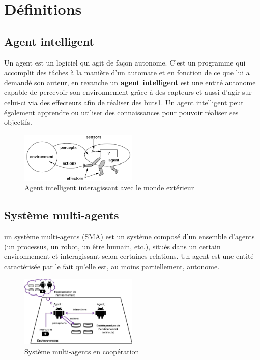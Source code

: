 \section{Définitions}
\subsection{Agent intelligent}
Un agent est un logiciel qui agit de façon autonome. C'est un programme qui accomplit des tâches à la manière d'un automate et en fonction de ce que lui a demandé son auteur, en revanche un \textbf{agent intelligent} est une entité autonome capable de percevoir son environnement grâce à des capteurs et aussi d'agir sur celui-ci via des effecteurs afin de réaliser des buts1. Un agent intelligent peut également apprendre ou utiliser des connaissances pour pouvoir réaliser ses objectifs.
\begin{figure}[H]
	\centering
	\includegraphics[width=0.5\textwidth]{imgs/intelligentAgent.png}
	\caption{Agent intelligent interagissant avec le monde extérieur }
\end{figure}
\newpage
\subsection{Système multi-agents}
un système multi-agents (SMA) est un système composé d'un ensemble d'agents (un processus, un robot, un être humain, etc.), situés dans un certain environnement et interagissant selon certaines relations. Un agent est une entité caractérisée par le fait qu'elle est, au moins partiellement, autonome.
\begin{figure}[H]
	\centering
	\includegraphics[width=0.5\textwidth]{imgs/SMA.jpg}
	\caption{Système multi-agents en coopération}
\end{figure}